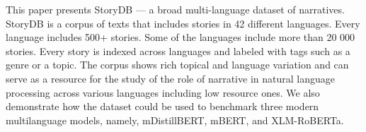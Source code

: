 This paper presents StoryDB — a broad multi-language dataset of narratives. StoryDB is a corpus of texts that includes stories in 42 different languages. Every language includes 500+ stories. Some of the languages include more than 20 000 stories. Every story is indexed across languages and labeled with tags such as a genre or a topic. The corpus shows rich topical and language variation and can serve as a resource for the study of the role of narrative in natural language processing across various languages including low resource ones. We also demonstrate how the dataset could be used to benchmark three modern multilanguage models, namely, mDistillBERT, mBERT, and XLM-RoBERTa.
